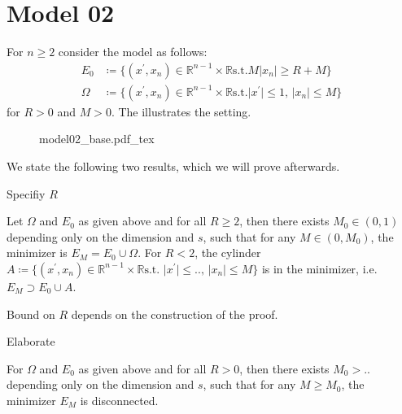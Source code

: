 \section{Model 02}
\label{sec:model02}

For \( n \geq 2 \) consider the model as follows:
\begin{align*}
	E_0    & \coloneqq \{(x^\prime, x_n) \in \mathbb{R}^{n - 1} \times \mathbb{R} \text{s.t.} M \lvert x_n \rvert \geq R + M \} \\
	\Omega & \coloneqq \{(x^\prime, x_n) \in \mathbb{R}^{n - 1} \times \mathbb{R} \text{s.t.} \lvert x^\prime \rvert \leq 1, \, \lvert x_n \rvert \leq M \}
\end{align*}
for \( R > 0 \) and \( M > 0 \). The  illustrates the setting.

\begin{figure}[h]
	\centering
	\def\svgscale{1}
	{model02_base.pdf_tex}
	\caption{}
	\label{fig:104}
\end{figure}

We state the following two results, which we will prove afterwards.

\begin{TODO}
	Specifiy \( R \)
\end{TODO}
\begin{theorem}
	\label{thm:103}
	Let \( \Omega \) and \( E_0 \) as given above and for all \( R \geq 2 \), then there
	exists \( M_0 \in (0, 1) \) depending only on the dimension and \( s \), such that
	for any \( M \in (0, M_0) \), the minimizer is \( E_M = E_0 \cup \Omega \). For \( R
	< 2 \), the cylinder \( A \coloneqq \{(x^\prime, x_n) \in \mathbb{R}^{n - 1} \times
	\mathbb{R} \text{s.t.~} \lvert x^\prime \rvert \leq.., \, \lvert x_n \rvert \leq M
	\} \) is in the minimizer, i.e.\ \( E_M \supset E_0 \cup A \).
\end{theorem}
\begin{note}
	Bound on \( R \) depends on the construction of the proof.
	\begin{TODO}
		Elaborate
	\end{TODO}
\end{note}

\begin{theorem}
	\label{thm:104}
	For \( \Omega \) and \( E_0 \) as given above and for all \( R > 0 \), then there
	exists \( M_0 >.. \) depending only on the dimension and \( s \), such that
	for any \( M \geq M_0 \), the minimizer \( E_M \) is disconnected.
\end{theorem}

